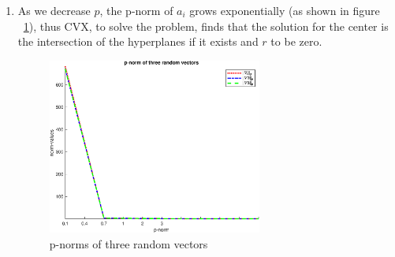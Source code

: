 \documentclass[10pt]{article}
\newcommand{\0}{\mat{0}}
\begin{document}
\begin{enumerate}
\begin{enumerate}
\begin{verbatim}
% Compute the Chebyshev center of a polyhedron
function [x_sol, r_sol] = chebyshev_center_with_norm(A, b, p)
% The goal is to find the largest Euclidean ball (i.e. its center and
% radius) that lies in a polyhedron described by linear inequalites in this
% fashion: P = {x : a_i'*x <= b_i, i=1,...,m}

rng('default')
format long g
[~,n]=size(A);

% Build and execute model
fprintf(1,'Computing Chebyshev center...');
cvx_begin
    variable r(1)
    variable x_c(2)
    maximize ( r )
    for k=1:n
        A(:, k)' * x_c + r * norm(A(:, k), p) <= b(k);
    end
cvx_end
fprintf(1,'Done! \n');
x_sol = x_c;
r_sol = r;


% Display results
fprintf(1,"The Chebyshev center coordinates are: \n");
disp(x_c);
txt = "Radius of largest 'scaled unit ball' using norm p:" + num2str(p) + "\n";
fprintf(1,txt);
disp(r);

% Generate the figure
x = linspace(-2,2);
for k=1:n
    plot(x, -x * A(1,k)./A(2,k) + b(k)./A(2,k),"b-");
    hold on
end

n_vecs = 100;
[x, y] = gen_random_vectors(n_vecs, p);
x = x.* r + x_c(1);
y = y.* r + x_c(2);

for i=1:n_vecs
    plot(x(i), y(i), "r." );
    hold on
end
plot(x_c(1),x_c(2),'b*');
xlabel("x-axis")
ylabel("y-axis")

txt1 = "# inequalities:" + num2str(n);
tx2 = "norm-p:" + num2str(p);
title({"Largest 'scaled unit ball' lying in a 2D polyhedron", txt1, tx2});
text(x_c(1), x_c(2), "\leftarrow  center")
axis([-1 1 -1 1])
axis equal
hold off
txt = "chebyshev_center_norm_" + num2str(p);
saveas(gcf,txt,'epsc')

function [x, y] = gen_random_vectors(n, p)
    r = randn(n, 2); % Use a large n
    for i=1:n
        norm_r = norm(r(i,:), p);
        r(i, :) = r(i, :) ./ norm_r;
    end
    x = r(:, 1);
    y = r(:, 2);
    
\end{verbatim}

\item As we decrease $p$, the p-norm of $a_i$ grows exponentially (as shown in figure ~\ref{fig6}), thus CVX, to solve the problem, finds that the solution for the center is the intersection of the hyperplanes if it exists and $r$ to be zero.

\begin{figure}[H]
	\centering
	\includegraphics[width=200pt]{figures/p_norm_trend}
	\caption{p-norms of three random vectors }
	\label{fig6}
\end{figure}


\end{enumerate}
\end{enumerate}
\end{document}

